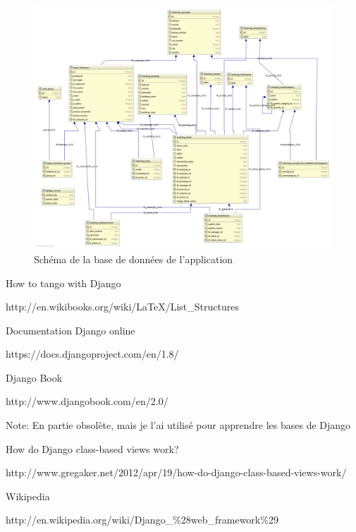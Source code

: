 \documentclass[12pt,table,a4paper]{report}
\begin{document}
\begin{figure}
\centering
\includegraphics[width=\textwidth]{images/schemas/ticket-database-schema.png}
\caption{Schéma de la base de données de l'application}
\label{fig:schema-database}
\end{figure}



\begin{thebibliography}{breitestes Label}
	    How to tango with Django
	    
	    http://en.wikibooks.org/wiki/LaTeX/List\_Structures
	
		Documentation Django online
		
		https://docs.djangoproject.com/en/1.8/
	
	    Django Book
	    
	    http://www.djangobook.com/en/2.0/
	    
	    Note: En partie obsolète, mais je l'ai utilisé pour apprendre les bases de Django
	    
			How do Django class-based views work?
			
			http://www.gregaker.net/2012/apr/19/how-do-django-class-based-views-work/
			
			Wikipedia
			
			http://en.wikipedia.org/wiki/Django\_\%28web\_framework\%29
\end{thebibliography}
\end{document}
